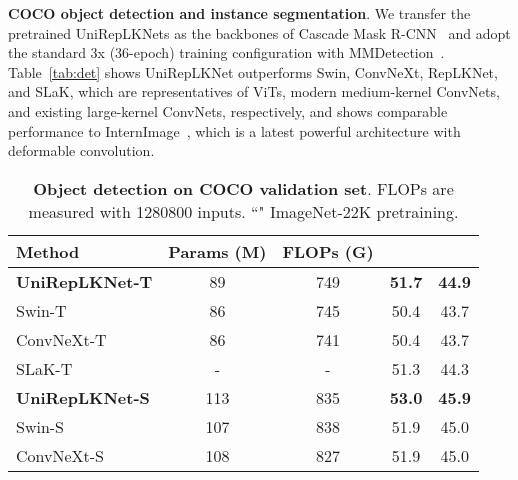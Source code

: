 \documentclass[10pt,twocolumn,letterpaper]{article}
\begin{document}
\noindent\textbf{COCO object detection and instance segmentation}. We transfer the pretrained UniRepLKNets as the backbones of Cascade Mask R-CNN~\cite{he2017mask,cai2019cascade} and adopt the standard 3x (36-epoch) training configuration with MMDetection~\cite{mmdetection}. Table~\ref{tab:det} shows UniRepLKNet outperforms Swin, ConvNeXt, RepLKNet, and SLaK, which are representatives of ViTs, modern medium-kernel ConvNets, and existing large-kernel ConvNets, respectively, and shows comparable performance to InternImage~\cite{wang2023internimage}, which is a latest powerful architecture with deformable convolution.

\begin{table}[t]
        \centering
    \renewcommand\arraystretch{0.89}
    \setlength{\tabcolsep}{0.9mm}
    \footnotesize
    \caption{\textbf{Object detection on COCO validation set}. FLOPs are measured with 1280800 inputs. ``" ImageNet-22K pretraining.}
    \vspace{-0.1in}
    
\begin{tabular}{l|c|c|c|c}
\hline
    Method & Params (M) &  FLOPs (G)  &   &     \\
    \hline
    \rowcolor{gray!20}
    \textbf{UniRepLKNet-T}   &          89  &   749     &   \textbf{51.7}    &   \textbf{44.9}     \\
    Swin-T~\cite{liu2021swin}      &   86   &   745     &   50.4    &   43.7\\
    ConvNeXt-T~\cite{liu2022convnet}  &   86   &   741      &   50.4    &   43.7\\
    SLaK-T~\cite{liu2022more}      &   -   &   -        &   51.3    &   44.3\\
    
    \hline
    \rowcolor{gray!20}
    \textbf{UniRepLKNet-S}       &   113  &   835    &   \textbf{53.0}      &     \textbf{45.9}      \\ 
    Swin-S~\cite{liu2021swin}      &   107   &   838    &   51.9    &   45.0\\
    ConvNeXt-S~\cite{liu2022convnet}  &   108   &   827     &   51.9    &   45.0\\
    

\end{tabular}
\end{table}
\end{document}
